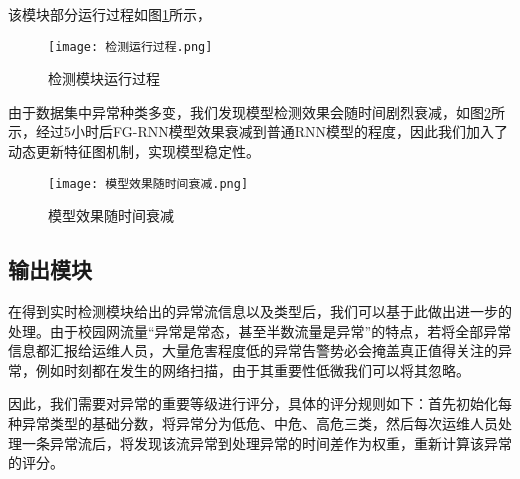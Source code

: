 该模块部分运行过程如图\ref{fig:检测模块运行过程}所示，

\begin{figure}
  \centering
  \texttt{[image: 检测运行过程.png]}
  \caption{检测模块运行过程}
  \label{fig:检测模块运行过程}
\end{figure}

由于数据集中异常种类多变，我们发现模型检测效果会随时间剧烈衰减，如图\ref{fig:模型效果随时间衰减}所示，经过5小时后FG-RNN模型效果衰减到普通RNN模型的程度，因此我们加入了动态更新特征图机制，实现模型稳定性。

\begin{figure}
  \centering
  \texttt{[image: 模型效果随时间衰减.png]}
  \caption{模型效果随时间衰减}
  \label{fig:模型效果随时间衰减}
\end{figure}

\subsection{输出模块}
在得到实时检测模块给出的异常流信息以及类型后，我们可以基于此做出进一步的处理。由于校园网流量“异常是常态，甚至半数流量是异常”的特点，若将全部异常信息都汇报给运维人员，大量危害程度低的异常告警势必会掩盖真正值得关注的异常，例如时刻都在发生的网络扫描，由于其重要性低微我们可以将其忽略。

因此，我们需要对异常的重要等级进行评分，具体的评分规则如下：首先初始化每种异常类型的基础分数，将异常分为低危、中危、高危三类，然后每次运维人员处理一条异常流后，将发现该流异常到处理异常的时间差作为权重，重新计算该异常的评分。





